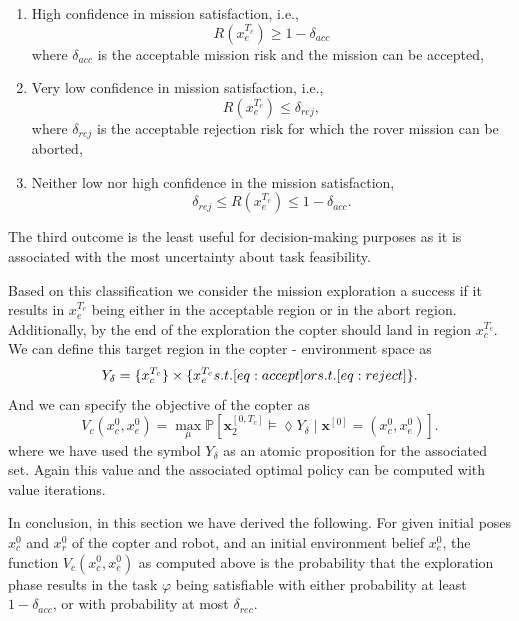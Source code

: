 \documentclass[conference]{IEEEtran}
\begin{document}
\begin{enumerate}
	\item High confidence in mission satisfaction, i.e.,
\begin{equation}\label{eq:accept}
	R(x_e^{T_c})\geq 1-\delta_{acc}
\end{equation}
where $\delta_{acc}$ is the acceptable mission risk and the mission can be accepted,
	\item Very low confidence in mission satisfaction,  i.e., 
\begin{equation}\label{eq:reject}
	R(x_e^{T_c})\leq \delta_{rej},
\end{equation}
where $\delta_{rej}$ is the acceptable rejection risk for which the  rover mission can be aborted,
	\item Neither low nor high confidence in the mission satisfaction,
	 \begin{equation}
	\delta_{rej} \leq R(x_e^{T_c})\leq 1-\delta_{acc}.
\end{equation}
\end{enumerate}
The third outcome is the least useful for decision-making purposes as it is associated with the most uncertainty about task feasibility.

Based on this classification we consider the mission exploration a success if it results in $x_e^{T_c}$ being either in the acceptable region or in the abort region. Additionally, by the end of the exploration the copter should land  in region $x^{T_c}_c$. We can define this target region in the copter - environment space as
\begin{equation}
Y_\delta = \{x^{T_c}_c\}\times 
	\{x_e^{T_c} \mbox{ s.t.  }\eqref{eq:accept}\mbox{ or s.t. }\eqref{eq:reject} \}.
\end{equation}
And we can specify the objective of the copter as 
\begin{equation}
\label{eq:coptervalue}
	V_c(x_c^0, x_e^0) = \max_{\mu} \mathbb{P} \left[ \mathbf{x}_2^{[0, T_c]} \models \lozenge Y_\delta \mid \mathbf{x}^{[0]} = (x_c^0, x_e^0) \right].
\end{equation}
where we have used the symbol $Y_\delta$ as an atomic proposition for the associated set.
Again this value and the associated optimal policy can be computed with value iterations.


In conclusion, in this section we have derived the following. For given initial poses $x_c^0$ and $x_r^0$ of the copter and robot, and an initial environment belief $x_e^0$, the function $V_c(x_c^0, x_e^0)$ as computed above is the probability that the exploration phase results in the task $\varphi$ being satisfiable with either probability at least $1- \delta_{acc}$, or with probability at most $\delta_{rec}$.  
\end{document}
